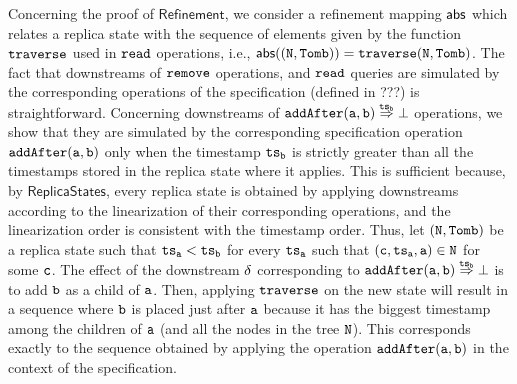 Concerning the proof of $\mathsf{Refinement}$, we consider a refinement mapping $\mathsf{abs}$ which relates a replica state with the sequence of elements given by the function ${\tt traverse}$ used in ${\tt read}$ operations, i.e., $\mathsf{abs}(({\tt N},{\tt Tomb}))={\tt traverse(N, Tomb)}$. The fact that downstreams of ${\tt remove}$ operations, and ${\tt read}$ queries are simulated by the corresponding operations of the specification (defined in ???) is straightforward. Concerning downstreams of $\alabellongind[{\tt addAfter}]{a,b}{\bot}{\ats_b}{}$ operations, we show that they are simulated by the corresponding specification operation $\alabelshort[{\tt addAfter}]{a,b}$ only when the timestamp $\mathtt{ts}_{\tt b}$ is strictly greater than all the timestamps stored in the replica state where it applies. This is sufficient because, by $\mathsf{ReplicaStates}$, every replica state is obtained by applying downstreams according to the linearization of their corresponding operations, and the linearization order is consistent with the timestamp order. Thus, let $({\tt N},{\tt Tomb})$ be a replica state such that $\mathtt{ts}_{\tt a} < \mathtt{ts}_{\tt b}$ for every $\mathtt{ts}_{\tt a}$ such that $({\tt c},\mathtt{ts}_{\tt a},{\tt a})\in {\tt N}$ for some ${\tt c}$. The effect of the downstream $\delta$ corresponding to $\alabellongind[{\tt addAfter}]{a,b}{\bot}{\ats_b}{}$ is to add ${\tt b}$ as a child of ${\tt a}$. Then, applying ${\tt traverse}$ on the new state will result in a sequence where ${\tt b}$ is placed just after ${\tt a}$ because it has the biggest timestamp among the children of ${\tt a}$ (and all the nodes in the tree ${\tt N}$). This corresponds exactly to the sequence obtained by applying the operation $\alabelshort[{\tt addAfter}]{a,b}$ in the context of the specification.

